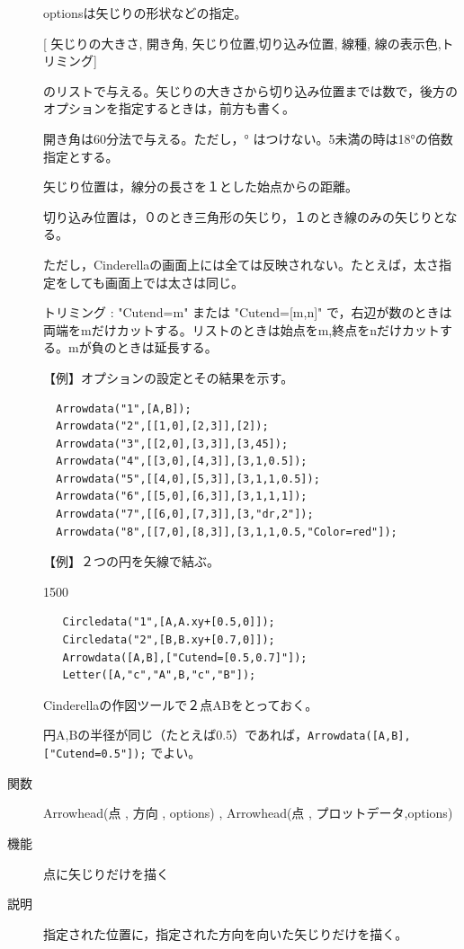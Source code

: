 \documentclass[papersize,a4paper,12pt,uplatex]{jsarticle}
\begin{document}
\begin{description}
optionsは矢じりの形状などの指定。
  
\hspace{10mm} [ 矢じりの大きさ, 開き角, 矢じり位置,切り込み位置, 線種, 線の表示色,トリミング] 

のリストで与える。矢じりの大きさから切り込み位置までは数で，後方のオプションを指定するときは，前方も書く。
  
開き角は60分法で与える。ただし，° はつけない。5未満の時は18°の倍数指定とする。
  
矢じり位置は，線分の長さを１とした始点からの距離。

切り込み位置は，０のとき三角形の矢じり，１のとき線のみの矢じりとなる。
  
ただし，Cinderellaの画面上には全ては反映されない。たとえば，太さ指定をしても画面上では太さは同じ。
 
トリミング :  "Cutend=m" または "Cutend=[m,n]" で，右辺が数のときは両端をmだけカットする。リストのときは始点をm,終点をnだけカットする。mが負のときは延長する。

\vspace{\baselineskip}
【例】オプションの設定とその結果を示す。
  
\begin{verbatim}
  Arrowdata("1",[A,B]);
  Arrowdata("2",[[1,0],[2,3]],[2]);
  Arrowdata("3",[[2,0],[3,3]],[3,45]);
  Arrowdata("4",[[3,0],[4,3]],[3,1,0.5]);
  Arrowdata("5",[[4,0],[5,3]],[3,1,1,0.5]);
  Arrowdata("6",[[5,0],[6,3]],[3,1,1,1]);
  Arrowdata("7",[[6,0],[7,3]],[3,"dr,2"]);
  Arrowdata("8",[[7,0],[8,3]],[3,1,1,0.5,"Color=red"]);
\end{verbatim}
\hspace{20mm}  

【例】２つの円を矢線で結ぶ。
  
\begin{layer}{150}{0}
\end{layer}
\hspace{20mm}

\begin{verbatim}
   Circledata("1",[A,A.xy+[0.5,0]]);
   Circledata("2",[B,B.xy+[0.7,0]]);
   Arrowdata([A,B],["Cutend=[0.5,0.7]"]);
   Letter([A,"c","A",B,"c","B"]);
\end{verbatim}
  Cinderellaの作図ツールで２点ABをとっておく。

円A,Bの半径が同じ（たとえば0.5）であれば，\verb|Arrowdata([A,B],["Cutend=0.5"]);| でよい。

\vspace{\baselineskip}
\hypertarget{arrowhead}{}
\item[関数]  Arrowhead(点 , 方向 , options) , Arrowhead(点 , プロットデータ,options)
\item[機能]  点に矢じりだけを描く
\item[説明]  指定された位置に，指定された方向を向いた矢じりだけを描く。


\end{description}
\end{document}

